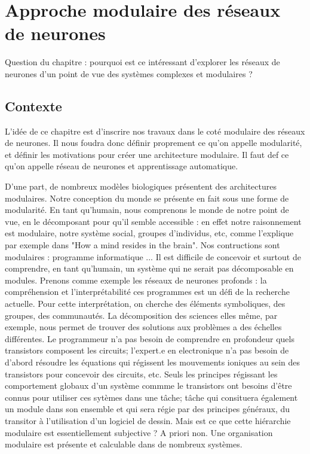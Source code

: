 \chapter{Approche modulaire des réseaux de neurones}
\graphicspath{{01-Modularite/}}

\minitoc


Question du chapitre : pourquoi est ce intéressant d'explorer les réseaux de neurones d'un point de vue des systèmes complexes et modulaires ? 


\section{Contexte}


L'idée de ce chapitre est d'inscrire nos travaux dans le coté modulaire des réseaux de neurones. Il nous foudra donc définir proprement ce qu'on appelle modularité, et définir les motivations pour créer une architecture modulaire. Il faut def ce qu'on appelle réseau de neurones et apprentissage automatique. 

D'une part, de nombreux modèles biologiques présentent des architectures modulaires. Notre conception du monde se présente en fait sous une forme de modularité. En tant qu'humain, nous comprenons le monde de notre point de vue, en le décomposant pour qu'il semble accessible : en effet notre raisonnement est modulaire, notre système social, groupes d'individus, etc, comme l'explique par exemple \cite{Morowitz1995TheMT} dans "How a mind resides in the brain".
Nos contructions sont modulaires : programme informatique ... Il est difficile de concevoir et surtout de comprendre, en tant qu'humain, un système qui ne serait pas décomposable en modules. Prenons comme exemple les réseaux de neurones profonds : la compréhension  et l'interprétabilité ces programmes est un défi de la recherche actuelle. Pour cette interprétation, on cherche des éléments symboliques, des groupes, des communautés. 
La décomposition des sciences elles même, par exemple, nous permet de trouver des solutions aux problèmes a des échelles différentes. Le programmeur n'a pas besoin de comprendre en profondeur quels transistors composent les circuits; l'expert.e en electronique n'a pas besoin de d'abord résoudre les équations qui régissent les mouvements ioniques au sein des transistors pour concevoir des circuits, etc. Seuls les principes régissant les comportement globaux d'un système commme le transistors ont besoins d'être connus pour utiliser ces sytèmes dans une tâche; tâche qui consituera également un module dans son ensemble et qui sera régie par des principes généraux, du transitor à l'utilisation d'un logiciel de dessin. 
Mais est ce que cette hiérarchie modulaire est essentiellement subjective ? A priori non. Une organisation modulaire est présente et calculable dans de nombreux systèmes.


